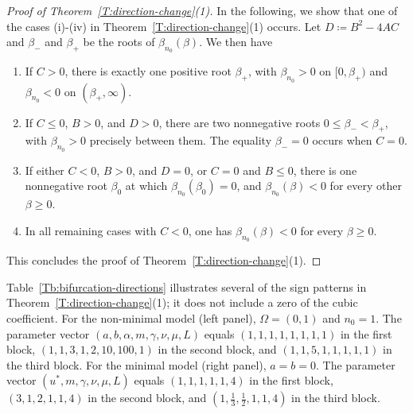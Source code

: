 \documentclass[11pt]{article} %
\theoremstyle{remark}
\theoremstyle{remark}
\numberwithin{equation}{section}
\numberwithin{figure}{section}
\numberwithin{table}{section}
\begin{document}
\begin{proof} [Proof of Theorem~\ref{T:direction-change}(1)]
  In the following, we show that one of the cases (i)-(iv) in
  Theorem~\ref{T:direction-change}(1) occurs. Let $D\coloneq B^2 - 4AC$ and
  $\beta_-$ and $\beta_+$ be the roots of $\beta_{n_0}(\beta)$. We then have
  \begin{enumerate}
    \item[(i)] If $C > 0$, there is exactly one positive root $\beta_+$, with
      $\beta_{n_0} > 0$ on $[0, \beta_+)$ and $\beta_{n_0} < 0$ on
      $(\beta_+,\infty)$.
    \item[(ii)] If $C \le 0$, $B > 0$, and $D > 0$, there are two nonnegative
      roots $0 \le \beta_- < \beta_+$, with $\beta_{n_0} > 0$ precisely between
      them. The equality $\beta_- = 0$ occurs when $C = 0$.
    \item[(iii)] If either $C < 0$, $B > 0$, and $D = 0$, or $C = 0$ and $B \le
      0$, there is one nonnegative root $\beta_0$ at which $\beta_{n_0}(\beta_0)
      = 0$, and $\beta_{n_0}(\beta) < 0$ for every other $\beta \ge 0$.
    \item[(iv)] In all remaining cases with $C < 0$, one has $\beta_{n_0}(\beta)
      < 0$ for every $\beta \ge 0$.
  \end{enumerate}
  This concludes the proof of Theorem~\ref{T:direction-change}(1).
\end{proof}


Table~\ref{Tb:bifurcation-directions} illustrates several of the sign patterns
in Theorem~\ref{T:direction-change}(1); it does not include a zero of the cubic
coefficient. For the non-minimal model (left panel), $\Omega = (0,1)$ and $n_0 =
1$. The parameter vector $(a,b,\alpha,m,\gamma,\nu,\mu,L)$ equals $(1, 1, 1, 1,
1, 1, 1, 1)$ in the first block, $(1, 1, 3, 1, 2, 10, 100, 1)$ in the second
block, and $(1, 1, 5, 1, 1, 1, 1, 1)$ in the third block. For the minimal model
(right panel), $a = b = 0$. The parameter vector $(u^*,m,\gamma,\nu,\mu,L)$
equals $(1, 1, 1, 1, 1, 4)$ in the first block, $(3, 1, 2, 1, 1, 4)$ in the
second block, and $(1, \tfrac13, \tfrac12, 1, 1, 4)$ in the third block.
\end{document}
